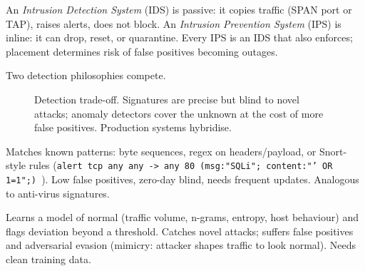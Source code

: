 \begin{definition}
An \emph{Intrusion Detection System} (IDS) is passive: it copies traffic (SPAN port or TAP), raises alerts, does not block. An \emph{Intrusion Prevention System} (IPS) is inline: it can drop, reset, or quarantine. Every IPS is an IDS that also enforces; placement determines risk of false positives becoming outages.
\end{definition}

Two detection philosophies compete.

\begin{figure}[h]\centering
{}
\caption{Detection trade-off. Signatures are precise but blind to novel attacks; anomaly detectors cover the unknown at the cost of more false positives. Production systems hybridise.}
\label{fig:ids-tradeoff}
\end{figure}

\begin{description}[leftmargin=1.2em, itemsep=0.35em]
    \item[Signature-based] Matches known patterns: byte sequences, regex on headers/payload, or Snort-style rules (\texttt{alert tcp any any -> any 80 (msg:"SQLi"; content:"' OR 1=1";) }). Low false positives, zero-day blind, needs frequent updates. Analogous to anti-virus signatures.
    \item[Anomaly-based] Learns a model of normal (traffic volume, n-grams, entropy, host behaviour) and flags deviation beyond a threshold. Catches novel attacks; suffers false positives and adversarial evasion (mimicry: attacker shapes traffic to look normal). Needs clean training data.
\end{description}

